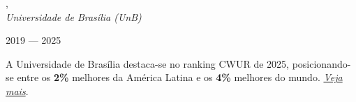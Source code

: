 , \\
\textit{Universidade de Brasília (UnB)}\strut \hfill 2019 --- 2025\\

\vspace*{7pt}

A Universidade de Brasília destaca-se no ranking CWUR de 2025, posicionando-se entre os \textbf{2\%} melhores da América Latina e os \textbf{4\%} melhores do mundo.
\href{https://cwur.org/2025/university-of-brasilia.php}{ \textit{Veja mais}}.

%
%
%
